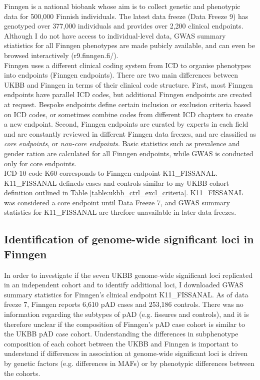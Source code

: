       Finngen is a national biobank whose aim is to collect genetic and phenotypic data for 500,000 Finnish individuals. The latest data freeze (Data Freeze 9) has genotyped over 377,000 individuals and provides over 2,200 clinical endpoints. Although I do not have access to individual-level data, GWAS summary stiatistics for all Finngen phenotypes are made pubicly available, and can even be browsed interactively (r9.finngen.fi/).\\

  Finngen uses a different clinical coding system from ICD to organise phenotypes into endpoints (Finngen endpoints). There are two main differences between UKBB and Finngen in terms of their clinical code structure. First, most Finngen endpoints have parallel ICD codes, but additional Finngen endpoints are created at request. Bespoke endpoints define certain inclusion or exclusion criteria based on ICD codes, or sometimes combine codes from different ICD chapters to create a new endpoint. Second, Finngen endpoints are curated by experts in each field and are constantly reviewed in different Finngen data freezes, and are classified as \textit{core endpoints}, or \textit{non-core endpoints}. Basic statistics such as prevalence and gender ration are calculated for all Finngen endpoints, while GWAS is conducted only for core endpoints.\\

ICD-10 code K60 corresponds to Finngen endpoint K11\_FISSANAL. K11\_FISSANAL defineds cases and controls similar to my UKBB cohort definition outlined in Table \ref{table:ukbb_ctrl_excl_criteria}. K11\_FISSANAL was considered a core endpoint until Data Freeze 7, and GWAS summary statistics for K11\_FISSANAL are threfore unavailable in later data freezes. 

\subsection{Identification of genome-wide significant loci in Finngen}

In order to investigate if the seven UKBB genome-wide significant loci replicated in an independent cohort and to identify additional loci, I downloaded GWAS summary statistics for Finngen's clinical endpoint K11\_FISSANAL. As of data freeze 7, Finngen reports 6,610 pAD cases and 253,186 controls. There was no information regarding the subtypes of pAD (e.g. fissures and controls), and it is therefore unclear if the composition of Finngen's pAD case cohort is similar to the UKBB pAD case cohort. Understanding the differences in subphenotype composition of each cohort between the UKBB and Finngen is important to understand if differences in association at genome-wide significant loci is driven by genetic factors (e.g. differences in MAFs) or by phenotypic differences between the cohorts. 

